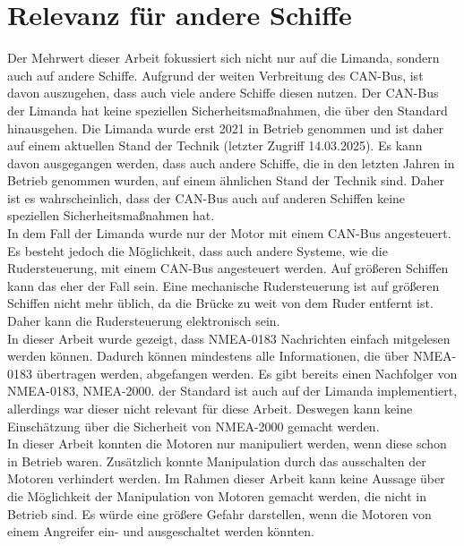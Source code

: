 \section{Relevanz für andere Schiffe}
Der Mehrwert dieser Arbeit fokussiert sich nicht nur auf die Limanda, sondern auch auf andere Schiffe.
Aufgrund der weiten Verbreitung des CAN-Bus, ist davon auszugehen, dass auch viele andere Schiffe diesen nutzen.
Der CAN-Bus der Limanda hat keine speziellen Sicherheitsmaßnahmen, die über den Standard hinausgehen. 
Die Limanda wurde erst 2021 in Betrieb genommen und ist daher auf einem aktuellen Stand der Technik \cite{limanda} (letzter Zugriff 14.03.2025).
Es kann davon ausgegangen werden, dass auch andere Schiffe, die in den letzten Jahren in Betrieb genommen wurden, auf einem
ähnlichen Stand der Technik sind. Daher ist es wahrscheinlich, dass der CAN-Bus auch auf anderen Schiffen keine speziellen
Sicherheitsmaßnahmen hat. \\
In dem Fall der Limanda wurde nur der Motor mit einem CAN-Bus angesteuert. Es besteht jedoch die Möglichkeit, dass auch 
andere Systeme, wie die Rudersteuerung, mit einem CAN-Bus angesteuert werden. Auf größeren Schiffen kann das eher der Fall sein. 
Eine mechanische Rudersteuerung ist auf größeren Schiffen nicht mehr üblich, da die Brücke zu weit von dem Ruder entfernt ist.
Daher kann die Rudersteuerung elektronisch sein. \\
In dieser Arbeit wurde gezeigt, dass NMEA-0183 Nachrichten einfach mitgelesen werden können. Dadurch können mindestens 
alle Informationen, die über NMEA-0183 übertragen werden, abgefangen werden. Es gibt bereits einen Nachfolger von NMEA-0183,
NMEA-2000. der Standard ist auch auf der Limanda implementiert, allerdings war dieser nicht relevant für diese Arbeit.
Deswegen kann keine Einschätzung über die Sicherheit von NMEA-2000 gemacht werden. \\
In dieser Arbeit konnten die Motoren nur manipuliert werden, wenn diese schon in Betrieb waren. Zusätzlich konnte
Manipulation durch das ausschalten der Motoren verhindert werden. Im Rahmen dieser Arbeit kann keine Aussage über 
die Möglichkeit der Manipulation von Motoren gemacht werden, die nicht in Betrieb sind. Es würde eine größere Gefahr
darstellen, wenn die Motoren von einem Angreifer ein- und ausgeschaltet werden könnten. \\
